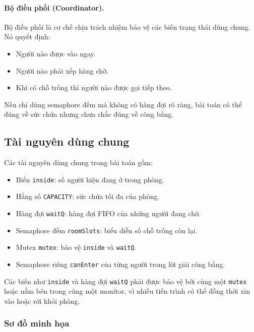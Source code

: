 \paragraph{Bộ điều phối (Coordinator).}

Bộ điều phối là cơ chế chịu trách nhiệm bảo vệ các biến trạng thái dùng
chung. Nó quyết định:

\begin{itemize}
    \item Người nào được vào ngay.
    \item Người nào phải xếp hàng chờ.
    \item Khi có chỗ trống thì người nào được gọi tiếp theo.
\end{itemize}

Nếu chỉ dùng semaphore đếm mà không có hàng đợi rõ ràng, bài toán có thể
đúng về sức chứa nhưng chưa chắc đúng về công bằng.

\subsection{Tài nguyên dùng chung}

Các tài nguyên dùng chung trong bài toán gồm:

\begin{itemize}
    \item Biến \texttt{inside}: số người hiện đang ở trong phòng.
    \item Hằng số \texttt{CAPACITY}: sức chứa tối đa của phòng.
    \item Hàng đợi \texttt{waitQ}: hàng đợi FIFO của những người đang chờ.
    \item Semaphore đếm \texttt{roomSlots}: biểu diễn số chỗ trống còn lại.
    \item Mutex \texttt{mutex}: bảo vệ \texttt{inside} và \texttt{waitQ}.
    \item Semaphore riêng \texttt{canEnter} của từng người trong lời giải
    công bằng.
\end{itemize}

Các biến như \texttt{inside} và hàng đợi \texttt{waitQ} phải được bảo vệ
bởi cùng một \texttt{mutex} hoặc nằm bên trong cùng một monitor, vì nhiều
tiến trình có thể đồng thời xin vào hoặc rời khỏi phòng.

\subsubsection*{Sơ đồ minh họa}

